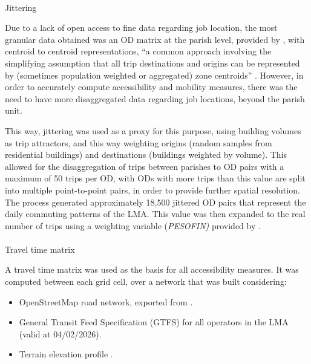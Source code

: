 \documentclass[
  authoryear,
  review,
  1p]{elsarticle}
\makeatletter
\let\oldparagraph\paragraph
\renewcommand{\paragraph}{
    \@ifstar
      \xxxParagraphStar
      \xxxParagraphNoStar
  }
\newcommand{\xxxParagraphStar}[1]{\oldparagraph*{#1}\mbox{}}
\newcommand{\xxxParagraphNoStar}[1]{\oldparagraph{#1}\mbox{}}
\makeatother
\begin{document}
\paragraph{Jittering}\label{sec-MET_jittering}

Due to a lack of open access to fine data regarding job location, the
most granular data obtained was an OD matrix at the parish level,
provided by \citet{INE_IMOB2017}, with centroid to centroid
representations, ``a common approach involving the simplifying
assumption that all trip destinations and origins can be represented by
(sometimes population weighted or aggregated) zone centroids''
\citep{Lovelace_2022}. However, in order to accurately compute
accessibility and mobility measures, there was the need to have more
disaggregated data regarding job locations, beyond the parish unit.

This way, jittering \citep{Lovelace_2022} was used as a proxy for this
purpose, using building volumes as trip attractors, and this way
weighting origins (random samples from residential buildings) and
destinations (buildings weighted by volume). This allowed for the
disaggregation of trips between parishes to OD pairs with a maximum of
50 trips per OD, with ODs with more trips than this value are split into
multiple point-to-point pairs, in order to provide further spatial
resolution. The process generated approximately 18,500 jittered OD pairs
that represent the daily commuting patterns of the LMA. This value was
then expanded to the real number of trips using a weighting variable
(\emph{PESOFIN)} provided by \citet{INE_IMOB2017}.

\paragraph{Travel time matrix}\label{sec-MET_TTmatrix}

A travel time matrix was used as the basis for all accessibility
measures. It was computed between each grid cell, over a network
\citep{Pereira_r5r_2021} that was built considering:

\begin{itemize}
\item
  OpenStreetMap \citep{OpenStreetMap} road network, exported from
  \citet{hot_osm}.
\item
  General Transit Feed Specification (GTFS) for all operators in the LMA
  (valid at 04/02/2026).
\item
  Terrain elevation profile \citep{copernicus_browser}.
\end{itemize}
\end{document}
